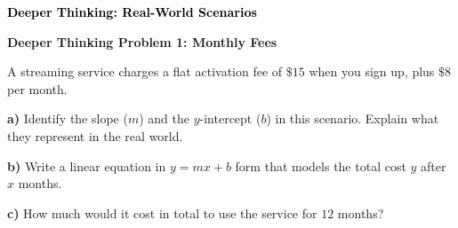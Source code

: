 \documentclass[12pt, letterpaper, fleqn]{article}
\begin{document}
\newpage

\begin{tcolorbox}[colback=customteal!20]
\large\textcolor{black}{\textbf{Deeper Thinking: Real-World Scenarios}}
\end{tcolorbox}

\vspace{3mm}

\begin{tcolorbox}[colback=white!15, colframe=black, boxrule=1.5pt, arc=4mm, left=6mm, right=6mm, top=5mm, bottom=5mm]

\textbf{Deeper Thinking Problem 1: Monthly Fees}

\medskip

\noindent
A streaming service charges a flat activation fee of $\$15$ when you sign up, plus $\$8$ per month. 

\vspace{5mm}

\noindent
\textbf{a)} Identify the slope ($m$) and the $y$-intercept ($b$) in this scenario. Explain what they represent in the real world.

\vspace{3cm}

\noindent
\textbf{b)} Write a linear equation in $y = mx + b$ form that models the total cost $y$ after $x$ months.

\vspace{2cm}

\noindent
\textbf{c)} How much would it cost in total to use the service for $12$ months?

\vspace{2cm}

\end{tcolorbox}
\end{document}
